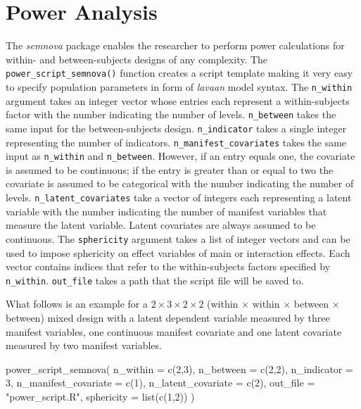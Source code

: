\documentclass[
]{book}
\newenvironment{Shaded}{\begin{snugshade}}{\end{snugshade}}
\newcommand{\AttributeTok}[1]{\textcolor[rgb]{0.77,0.63,0.00}{#1}}
\newcommand{\DecValTok}[1]{\textcolor[rgb]{0.00,0.00,0.81}{#1}}
\newcommand{\FunctionTok}[1]{\textcolor[rgb]{0.00,0.00,0.00}{#1}}
\newcommand{\NormalTok}[1]{#1}
\newcommand{\StringTok}[1]{\textcolor[rgb]{0.31,0.60,0.02}{#1}}
\begin{document}
\hypertarget{power-analysis}{%
\chapter{Power Analysis}\label{power-analysis}}

The \emph{semnova} package enables the researcher to perform power calculations for within- and between-subjects designs of any complexity. The \texttt{power\_script\_semnova()} function creates a script template making it very easy to specify population parameters in form of \emph{lavaan} model syntax. The \texttt{n\_within} argument takes an integer vector whose entries each represent a within-subjects factor with the number indicating the number of levels. \texttt{n\_between} takes the same input for the between-subjects design. \texttt{n\_indicator} takes a single integer representing the number of indicators. \texttt{n\_manifest\_covariates} takes the same input as \texttt{n\_within} and \texttt{n\_between}. However, if an entry equals one, the covariate is assumed to be continuous; if the entry is greater than or equal to two the covariate is assumed to be categorical with the number indicating the number of levels. \texttt{n\_latent\_covariates} take a vector of integers each representing a latent variable with the number indicating the number of manifest variables that measure the latent variable. Latent covariates are always assumed to be continuous. The \texttt{sphericity} argument takes a list of integer vectors and can be used to impose sphericity on effect variables of main or interaction effects. Each vector contains indices that refer to the within-subjects factors specified by \texttt{n\_within}. \texttt{out\_file} takes a path that the script file will be saved to.

What follows is an example for a \(2 \times 3 \times 2 \times 2\) (within \(\times\) within \(\times\) between \(\times\) between) mixed design with a latent dependent variable measured by three manifest variables, one continuous manifest covariate and one latent covariate measured by two manifest variables.

\begin{Shaded}
\begin{Highlighting}[]
\FunctionTok{power\_script\_semnova}\NormalTok{(}
    \AttributeTok{n\_within =} \FunctionTok{c}\NormalTok{(}\DecValTok{2}\NormalTok{,}\DecValTok{3}\NormalTok{),}
    \AttributeTok{n\_between =} \FunctionTok{c}\NormalTok{(}\DecValTok{2}\NormalTok{,}\DecValTok{2}\NormalTok{),}
    \AttributeTok{n\_indicator =} \DecValTok{3}\NormalTok{,}
    \AttributeTok{n\_manifest\_covariate =} \FunctionTok{c}\NormalTok{(}\DecValTok{1}\NormalTok{),}
    \AttributeTok{n\_latent\_covariate =} \FunctionTok{c}\NormalTok{(}\DecValTok{2}\NormalTok{),}
    \AttributeTok{out\_file =} \StringTok{"power\_script.R"}\NormalTok{,}
    \AttributeTok{sphericity =} \FunctionTok{list}\NormalTok{(}\FunctionTok{c}\NormalTok{(}\DecValTok{1}\NormalTok{,}\DecValTok{2}\NormalTok{))}
\NormalTok{)}
\end{Highlighting}
\end{Shaded}
\end{document}
